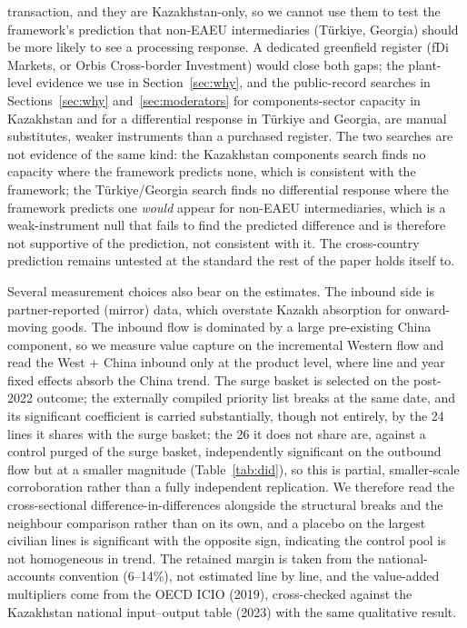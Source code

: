 \documentclass[12pt]{article}
\begin{document}
transaction, and they are Kazakhstan-only, so we cannot use them to test the framework's
prediction that non-EAEU intermediaries (T\"urkiye, Georgia) should be more likely to see a
processing response. A dedicated greenfield register (fDi Markets, or Orbis Cross-border
Investment) would close both gaps; the plant-level evidence we use in Section~\ref{sec:why},
and the public-record searches in Sections~\ref{sec:why} and~\ref{sec:moderators} for
components-sector capacity in Kazakhstan and for a differential response in T\"urkiye and
Georgia, are manual substitutes, weaker instruments than a purchased register. The two
searches are not evidence of the same kind: the Kazakhstan components search finds no
capacity where the framework predicts none, which is consistent with the framework; the
T\"urkiye/Georgia search finds no differential response where the framework predicts one
\emph{would} appear for non-EAEU intermediaries, which is a weak-instrument null that fails to
find the predicted difference and is therefore not supportive of the prediction, not
consistent with it. The cross-country prediction remains untested at the standard the rest of
the paper holds itself to.

Several measurement choices also bear on the estimates. The inbound side is partner-reported
(mirror) data, which overstate Kazakh absorption for onward-moving goods. The inbound flow is
dominated by a large pre-existing China component, so we measure value capture on the
incremental Western flow and read the West + China inbound only at the product level, where
line and year fixed effects absorb the China trend. The surge basket is selected on the
post-2022 outcome; the externally compiled priority list breaks at the same date, and its
significant coefficient is carried substantially, though not entirely, by the 24 lines it
shares with the surge basket; the 26 it does not share are, against a control purged of the
surge basket, independently significant on the outbound flow but at a smaller magnitude
(Table~\ref{tab:did}), so this is partial, smaller-scale corroboration
rather than a fully independent replication. We
therefore read the cross-sectional difference-in-differences alongside the structural breaks
and the neighbour comparison rather than on its own, and a placebo on the largest civilian lines
is significant with the opposite sign, indicating the control pool is not homogeneous in
trend. The retained margin is taken from the national-accounts convention (6--14\%), not
estimated line by line, and the value-added multipliers come from the OECD ICIO (2019),
cross-checked against the Kazakhstan national input--output table (2023) with the same
qualitative result.
\end{document}
